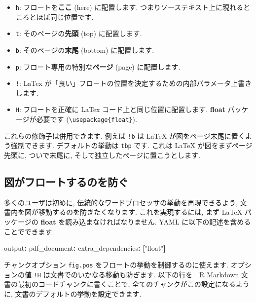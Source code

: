 \documentclass[
  11pt,
  lualatex,ja=standard,jafont=noto]{bxjsreport}
\newenvironment{Shaded}{\begin{snugshade}}{\end{snugshade}}
\newcommand{\AttributeTok}[1]{\textcolor[rgb]{0.77,0.63,0.00}{#1}}
\newcommand{\FunctionTok}[1]{\textcolor[rgb]{0.00,0.00,0.00}{#1}}
\newcommand{\KeywordTok}[1]{\textcolor[rgb]{0.13,0.29,0.53}{\textbf{#1}}}
\newcommand{\StringTok}[1]{\textcolor[rgb]{0.31,0.60,0.02}{#1}}
\providecommand{\tightlist}{%
  \setlength{\itemsep}{0pt}\setlength{\parskip}{0pt}}
\begin{document}
\begin{itemize}
\tightlist
\item
  \texttt{h}: フロートを\textbf{ここ} (here) に配置します. つまりソーステキスト上に現れるところとほぼ同じ位置です.
\item
  \texttt{t}: そのページの\textbf{先頭} (top) に配置します.
\item
  \texttt{b}: そのページの\textbf{末尾} (bottom) に配置します.
\item
  \texttt{p}: フロート専用の特別な\textbf{ページ} (page) に配置します.
\item
  \texttt{!}: LaTex が「良い」フロートの位置を決定するための内部パラメータ上書きします.
\item
  \texttt{H}: フロートを正確に LaTex コード上と同じ位置に配置します. \textbf{float} パッケージが必要です (\texttt{\textbackslash{}usepackage\{float\}}).
\end{itemize}

これらの修飾子は併用できます. 例えば \texttt{!b} は LaTeX が図をページ末尾に置くよう強制できます. デフォルトの挙動は \texttt{tbp} です. これは LaTeX が図をまずページ先頭に, ついで末尾に, そして独立したページに置こうとします.

\hypertarget{prevent-figures-from-floating}{%
\subsection{図がフロートするのを防ぐ}\label{prevent-figures-from-floating}}

多くのユーザは初めに, 伝統的なワードプロセッサの挙動を再現できるよう, 文書内を図が移動するのを防ぎたくなります. これを実現するには, まず LaTeX パッケージの \textbf{float} を読み込まなければなりません. YAML に以下の記述を含めることでできます.

\begin{Shaded}
\begin{Highlighting}[]
\FunctionTok{output}\KeywordTok{:}\AttributeTok{ }
\AttributeTok{  }\FunctionTok{pdf\_document}\KeywordTok{:}
\AttributeTok{    }\FunctionTok{extra\_dependencies}\KeywordTok{:}\AttributeTok{ }\KeywordTok{[}\StringTok{"float"}\KeywordTok{]}
\end{Highlighting}
\end{Shaded}

チャンクオプション \texttt{fig.pos} をフロートの挙動を制御するのに使えます. オプションの値 \texttt{!H} は文書でのいかなる移動も防ぎます. 以下の行を　R Markdown 文書の最初のコードチャンクに書くことで, 全てのチャンクがこの設定になるように, 文書のデフォルトの挙動を設定できます.
\end{document}
